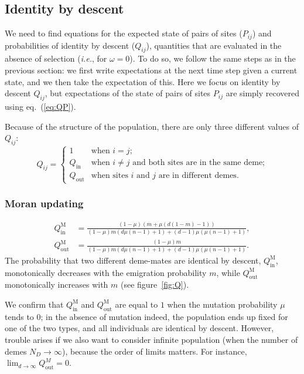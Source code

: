 \documentclass[11pt, letterpaper]{article}
\renewcommand{\eqref}[1]{\textup{{\normalfont eq.~(\ref{#1}}\normalfont)}}
\newcommand{\ie}{\textit{i.\!e.\!}}
\newcommand{\Moran}{\textrm{M}}
\newcommand{\Qin}{Q_{\textrm{in}}}
\newcommand{\Qout}{Q_{\textrm{out}}}
\newcommand{\ndemes}{N_D}
\begin{document}
\subsection{Identity by descent}

We need to find equations for the expected state of pairs of sites ($P_{ij}$) and probabilities of identity by descent ($Q_{ij}$), quantities that are evaluated in the absence of selection (\ie, for $\omega=0$). To do so, we follow the same steps as in the previous section: we first write expectations at the next time step given a current state, and we then take the expectation of this. Here we focus on identity by descent $Q_{ij}$, but expectations of the state of pairs of sites $P_{ij}$ are simply recovered using \eqref{eq:QP}. 

Because of the structure of the population, there are only three different values of $Q_{ij}$:
\begin{equation}
Q_{ij} = 
\begin{cases}
1 & \textrm{when $i=j$;}\\
%
\Qin & \textrm{when $i\neq j$ and both sites are in the same deme;}\\
%
\Qout & \textrm{when sites $i$ and $j$ are in different demes.}
\end{cases}
\end{equation}

\subsubsection{Moran updating} 

\begin{subequations}\label{eq:QM}
\begin{align}
\Qin^{\Moran} &= \frac{(1-\mu ) \left(m + \mu  (d (1-m)-1)\right)}{(1-\mu ) m (d \mu  (n-1)+1)+(d-1) \mu  (\mu  (n-1)+1)},\\
%
%
\Qout^{\Moran} & = \frac{(1-\mu ) m}{(1-\mu ) m (d \mu  (n-1)+1)+(d-1) \mu  (\mu  (n-1)+1)}.
\end{align}
\end{subequations}
%
The probability that two different deme-mates are identical by descent, $\Qin^{\Moran}$, monotonically decreases with the emigration probability $m$, while  $\Qout^{\Moran}$ monotonically increases with $m$ (see figure~\ref{fig:Q}). 

We confirm that $\Qin^{\Moran}$ and $\Qout^{\Moran}$ are equal to $1$ when the mutation probability $\mu$ tends to $0$; in the absence of mutation indeed, the population ends up fixed for one of the two types, and all individuals are identical by descent. However, trouble arises if we also want to consider infinite population (when the number of demes $\ndemes \to \infty$), because the order of limits matters. %
For instance, $\lim_{d\to \infty} \Qout^{M}=0$. 
\end{document}
